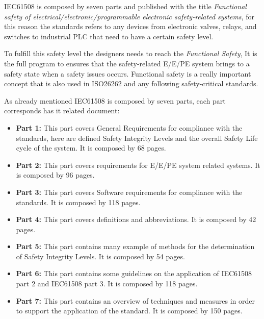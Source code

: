 {{{		    
		    IEC61508 is composed by seven parts and published with the title \textit{Functional safety of electrical/electronic/programmable electronic safety-related systems}, for this reason the standards refers to any devices from electronic valves, relays, and switches to industrial PLC that need to have a certain safety level.
		    
		    To fulfill this safety level the designers needs to reach the \textit{Functional Safety}, It is the full program to ensures that the safety-related E/E/PE system brings to a safety state when a safety issues occurs. Functional safety is a really important concept that is also used in ISO26262 and any following safety-critical standards.
		    
		    As already mentioned IEC61508 is composed by seven parts, each part corresponds has it related document:
		    \begin{itemize}
		        \item \textbf{Part 1:} This part covers General Requirements for compliance with the standards, here are defined Safety Integrity Levels and the overall Safety Life cycle of the system. It is composed by 68 pages.
		        \item \textbf{Part 2:} This part covers requirements for E/E/PE system related systems. It is composed by 96 pages.
		        \item \textbf{Part 3:} This part covers Software requirements for compliance with the standards. It is composed by 118 pages.
		        \item \textbf{Part 4:} This part covers definitions and abbreviations. It is composed by 42 pages.
		        \item \textbf{Part 5:} This part contains many example of methods for the determination of Safety Integrity Levels. It is composed by 54 pages.
		        \item \textbf{Part 6:} This part contains some guidelines on the application of IEC61508 part 2 and IEC61508 part 3. It is composed by  118 pages.
		        \item \textbf{Part 7:} This part contains an overview of techniques and measures in order to support the application of the standard. It is composed by 150 pages.
		    \end{itemize}
		    
		    
}}}
